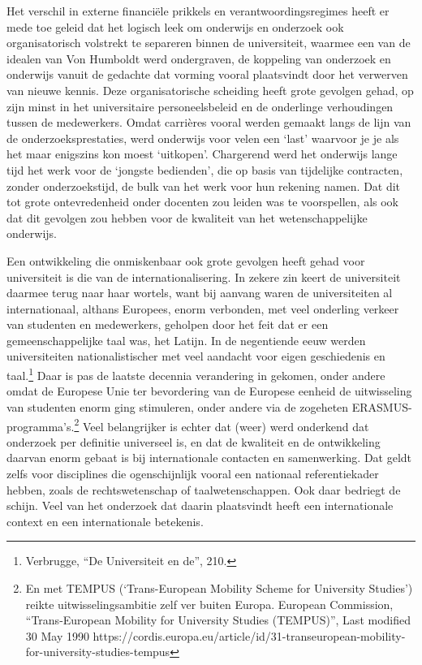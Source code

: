 \documentclass{jote-book}
\begin{document}
	Het verschil in externe financiële prikkels en verantwoordingsregimes heeft er mede toe geleid dat het logisch leek om onderwijs en onderzoek ook organisatorisch volstrekt te separeren binnen de universiteit, waarmee een van de idealen van Von Humboldt werd ondergraven, de koppeling van onderzoek en onderwijs vanuit de gedachte dat vorming vooral plaatsvindt door het verwerven van nieuwe kennis. Deze organisatorische scheiding heeft grote gevolgen gehad, op zijn minst in het universitaire personeelsbeleid en de onderlinge verhoudingen tussen de medewerkers. Omdat carrières vooral werden gemaakt langs de lijn van de onderzoeksprestaties, werd onderwijs voor velen een ‘last' waarvoor je je als het maar enigszins kon moest ‘uitkopen'. Chargerend werd het onderwijs lange tijd het werk voor de ‘jongste bedienden', die op basis van tijdelijke contracten, zonder onderzoekstijd, de bulk van het werk voor hun rekening namen. Dat dit tot grote ontevredenheid onder docenten zou leiden was te voorspellen, als ook dat dit gevolgen zou hebben voor de kwaliteit van het wetenschappelijke onderwijs.



	Een ontwikkeling die onmiskenbaar ook grote gevolgen heeft gehad voor universiteit is die van de internationalisering. In zekere zin keert de universiteit daarmee terug naar haar wortels, want bij aanvang waren de universiteiten al internationaal, althans Europees, enorm verbonden, met veel onderling verkeer van studenten en medewerkers, geholpen door het feit dat er een gemeenschappelijke taal was, het Latijn. In de negentiende eeuw werden universiteiten nationalistischer met veel aandacht voor eigen geschiedenis en taal.\footnote{Verbrugge, “De Universiteit en de”, 210.} Daar is pas de laatste decennia verandering in gekomen, onder andere omdat de Europese Unie ter bevordering van de Europese eenheid de uitwisseling van studenten enorm ging stimuleren, onder andere via de zogeheten ERASMUS-programma's.\footnote{En met TEMPUS (‘Trans-European Mobility Scheme for University Studies') reikte uitwisselingsambitie zelf ver buiten Europa. European Commission, “Trans-European Mobility for University Studies (TEMPUS)”, Last modified 30 May 1990 https://cordis.europa.eu/article/id/31-transeuropean-mobility-for-university-studies-tempus } Veel belangrijker is echter dat (weer) werd onderkend dat onderzoek per definitie universeel is, en dat de kwaliteit en de ontwikkeling daarvan enorm gebaat is bij internationale contacten en samenwerking. Dat geldt zelfs voor disciplines die ogenschijnlijk vooral een nationaal referentiekader hebben, zoals de rechtswetenschap of taalwetenschappen. Ook daar bedriegt de schijn. Veel van het onderzoek dat daarin plaatsvindt heeft een internationale context en een internationale betekenis.
\end{document}

